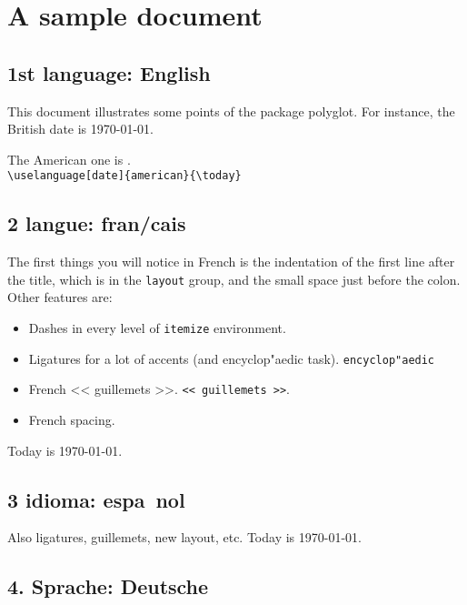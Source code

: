 \documentclass{book}
\begin{document}
\chapter{A sample document}

\section{1st language: English}

This document illustrates some points of the package \textsf{polyglot}.
For instance, the British date is \today.

The American one is
.\\
\verb=\uselanguage[date]{american}{\today}=

\unselectlanguage
{}

\section{2 langue: fran/cais}

The first things you will notice in French is the indentation of the
first line after the title, which is in the \verb=layout= group, and the
small space just before the colon. Other features are:
\begin{itemize}
\item Dashes in every level of \verb=itemize= environment.
\item Ligatures for a lot of accents (and encyclop"aedic
task). \verb=encyclop"aedic=
\item French << guillemets >>. \verb=<< guillemets >>=.
\item French spacing.
\end{itemize}

Today is \today.

\unselectlanguage
{}

\section{3 idioma: espa~nol}

Also ligatures, guillemets, new layout, etc. Today is \today.

\clearpage

\unselectlanguage
{}

\section{4. Sprache: Deutsche}
\end{document}
